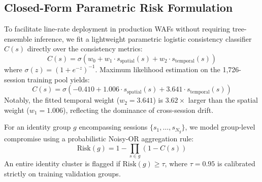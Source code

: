 \documentclass[conference]{IEEEtran}
\begin{document}
\subsection{Closed-Form Parametric Risk Formulation}
To facilitate line-rate deployment in production WAFs without requiring tree-ensemble inference, we fit a lightweight parametric logistic consistency classifier $C(s)$ directly over the consistency metrics:
\begin{equation}
C(s) = \sigma(w_0 + w_1 \cdot s_{\text{spatial}}(s) + w_2 \cdot s_{\text{temporal}}(s))
\label{eq:logistic}
\end{equation}
where $\sigma(z) = (1 + e^{-z})^{-1}$. Maximum likelihood estimation on the 1,726-session training pool yields:
\begin{equation}
C(s) = \sigma(-0.410 + 1.006 \cdot s_{\text{spatial}}(s) + 3.641 \cdot s_{\text{temporal}}(s))
\label{eq:fitted_logistic}
\end{equation}
Notably, the fitted temporal weight ($w_2 = 3.641$) is $3.62\times$ larger than the spatial weight ($w_1 = 1.006$), reflecting the dominance of cross-session drift.

For an identity group $g$ encompassing sessions $\{s_1, \dots, s_{N_g}\}$, we model group-level compromise using a probabilistic Noisy-OR aggregation rule:
\begin{equation}
\text{Risk}(g) = 1 - \prod_{s \in g} (1 - C(s))
\label{eq:noisy_or}
\end{equation}
An entire identity cluster is flagged if $\text{Risk}(g) \ge \tau$, where $\tau = 0.95$ is calibrated strictly on training validation groups.
\end{document}
